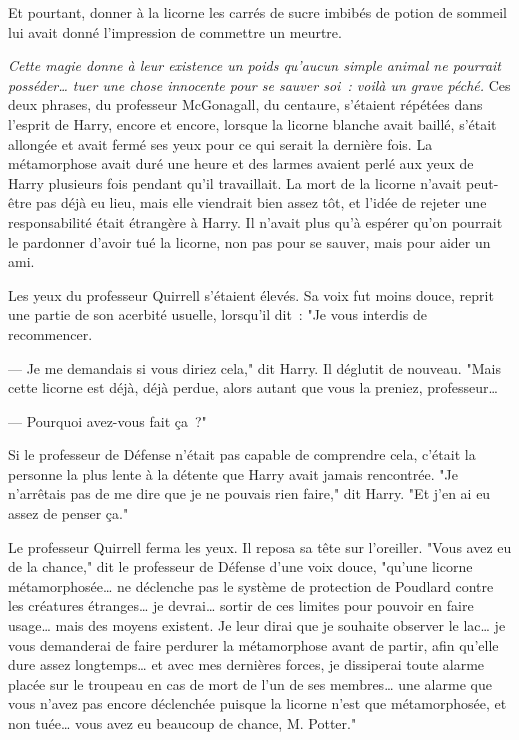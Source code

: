 Et pourtant, donner à la licorne les carrés de sucre imbibés de potion de sommeil lui avait donné l'impression de commettre un meurtre.

\emph{Cette magie donne à leur existence un poids qu'aucun simple animal ne pourrait posséder… tuer une chose innocente pour se sauver soi~: voilà un grave péché.} Ces deux phrases, du professeur McGonagall, du centaure, s'étaient répétées dans l'esprit de Harry, encore et encore, lorsque la licorne blanche avait baillé, s'était allongée et avait fermé ses yeux pour ce qui serait la dernière fois. La métamorphose avait duré une heure et des larmes avaient perlé aux yeux de Harry plusieurs fois pendant qu'il travaillait. La mort de la licorne n'avait peut-être pas déjà eu lieu, mais elle viendrait bien assez tôt, et l'idée de rejeter une responsabilité était étrangère à Harry. Il n'avait plus qu'à espérer qu'on pourrait le pardonner d'avoir tué la licorne, non pas pour se sauver, mais pour aider un ami.

Les yeux du professeur Quirrell s'étaient élevés. Sa voix fut moins douce, reprit une partie de son acerbité usuelle, lorsqu'il dit~: "Je vous interdis de recommencer.

--- Je me demandais si vous diriez cela," dit Harry. Il déglutit de nouveau. "Mais cette licorne est déjà, déjà perdue, alors autant que vous la preniez, professeur…

--- Pourquoi avez-vous fait ça~?"

Si le professeur de Défense n'était pas capable de comprendre cela, c'était la personne la plus lente à la détente que Harry avait jamais rencontrée. "Je n'arrêtais pas de me dire que je ne pouvais rien faire," dit Harry. "Et j'en ai eu assez de penser ça."

Le professeur Quirrell ferma les yeux. Il reposa sa tête sur l'oreiller. "Vous avez eu de la chance," dit le professeur de Défense d'une voix douce, "qu'une licorne métamorphosée… ne déclenche pas le système de protection de Poudlard contre les créatures étranges… je devrai… sortir de ces limites pour pouvoir en faire usage… mais des moyens existent. Je leur dirai que je souhaite observer le lac… je vous demanderai de faire perdurer la métamorphose avant de partir, afin qu'elle dure assez longtemps… et avec mes dernières forces, je dissiperai toute alarme placée sur le troupeau en cas de mort de l'un de ses membres… une alarme que vous n'avez pas encore déclenchée puisque la licorne n'est que métamorphosée, et non tuée… vous avez eu beaucoup de chance, M. Potter."

